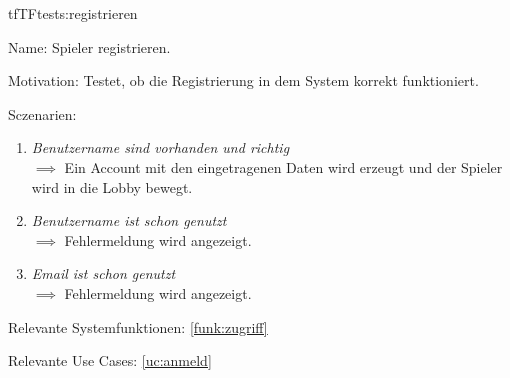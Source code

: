\begin{description}[leftmargin=5em, style=sameline]

\begin{lhp}{tf}{TF}{tests:registrieren}
	\item [Name:] Spieler registrieren.
	\item [Motivation:] Testet, ob die Registrierung in dem System korrekt funktioniert.
	\item [Sczenarien:] \hfill
		\begin{enumerate}
			\item \textit{Benutzername sind vorhanden und richtig} \\ $\implies$ Ein Account mit den eingetragenen Daten wird erzeugt und der Spieler wird in die Lobby bewegt.
			\item \textit{Benutzername ist schon genutzt} \\ $\implies$ Fehlermeldung wird angezeigt.
			\item \textit{Email ist schon genutzt} \\ $\implies$ Fehlermeldung wird angezeigt.
		\end{enumerate}
	\item [Relevante Systemfunktionen:] \ref{funk:zugriff}
	\item [Relevante Use Cases:] \ref{uc:anmeld}
\end{lhp}

\end{description}

